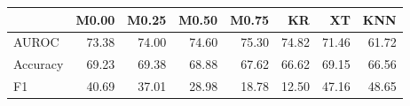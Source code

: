 \begin{tabular}{lrrrrrrr}
\toprule
 & M0.00 & M0.25 & M0.50 & M0.75 & KR & XT & KNN \\
\midrule
AUROC & 73.38 & 74.00 & 74.60 & 75.30 & 74.82 & 71.46 & 61.72 \\
Accuracy & 69.23 & 69.38 & 68.88 & 67.62 & 66.62 & 69.15 & 66.56 \\
F1 & 40.69 & 37.01 & 28.98 & 18.78 & 12.50 & 47.16 & 48.65 \\
\bottomrule
\end{tabular}
